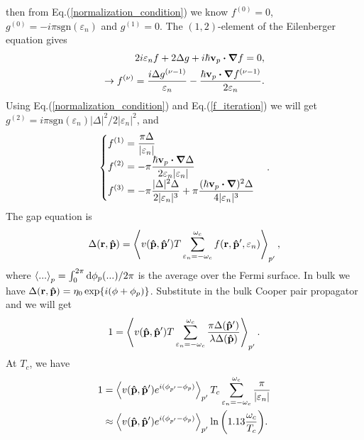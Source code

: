 \documentclass[aps,prb,reprint,groupedaddress]{revtex4-2}
\begin{document}
then from Eq.(\ref{normalization_condition}) we know $f^{(0)}=0$, $g^{(0)}=-i\pi\text{sgn}(\varepsilon_n)$ and $g^{(1)}=0$. The $(1,2)$-element of the Eilenberger equation gives
\begin{align}\label{f_iteration}
    2i\varepsilon_nf+2\Delta g+i\hbar\vb{v}_p\vdot\grad{f}=0,\nonumber \\
    \rightarrow f^{(\nu)}=\frac{i\Delta g^{(\nu-1)}}{\varepsilon_n}-\frac{\hbar\vb{v}_p\vdot\grad{f^{(\nu-1)}}}{2\varepsilon_n}.
\end{align}
Using Eq.(\ref{normalization_condition}) and Eq.(\ref{f_iteration}) we will get $g^{(2)}=i\pi\text{sgn}(\varepsilon_n)|\Delta|^2/2|\varepsilon_n|^2$, and
\begin{align}\label{f123}
    \begin{cases}
        \begin{aligned}
            f^{(1)} & =\frac{\pi\Delta}{|\varepsilon_n|}                                                                               \\
            f^{(2)} & =-\pi\frac{\hbar\vb{v}_p\vdot\grad{\Delta}}{2\varepsilon_n|\varepsilon_n|}                                       \\
            f^{(3)} & =-\pi\frac{|\Delta|^2\Delta}{2|\varepsilon_n|^3}+\pi\frac{(\hbar\vb{v}_p\vdot\grad)^2\Delta}{4|\varepsilon_n|^3}
        \end{aligned}
    \end{cases}.
\end{align}
The gap equation is
\begin{align}\label{gap_eq}
    \Delta(\vb{r},\vu{p})=\ev{v(\vu{p},\vu{p}')T\sum_{\varepsilon_n=-\omega_c}^{\omega_c}f(\vb{r},\vu{p}',\varepsilon_n)}_{p'},
\end{align}
where $\ev{...}_p=\int_0^{2\pi}\dd\phi_p(...)/2\pi$ is the average over the Fermi surface. In bulk we have $\Delta(\vb{r},\vu{p})=\eta_0\exp{i(\phi+\phi_p)}$. Substitute in the bulk Cooper pair propagator and we will get
\begin{align}
    1=\ev{v(\vu{p},\vu{p}')T\sum_{\varepsilon_n=-\omega_c}^{\omega_c}\frac{\pi\Delta(\vu{p}')}{\lambda\Delta(\vu{p})}}_{p'}.
\end{align}
At $T_c$, we have
\begin{align}\label{digammaTc}
    1 & =\ev{v(\vu{p},\vu{p}')e^{i(\phi_{p'}-\phi_p)}}_{p'}T_c\sum_{\varepsilon_n=-\omega_c}^{\omega_c}\frac{\pi}{|\varepsilon_n|}\nonumber \\
      & \approx\ev{v(\vu{p},\vu{p}')e^{i(\phi_{p'}-\phi_p)}}_{p'}\ln{\left(1.13\frac{\omega_c}{T_c}\right)}.
\end{align}
\end{document}
